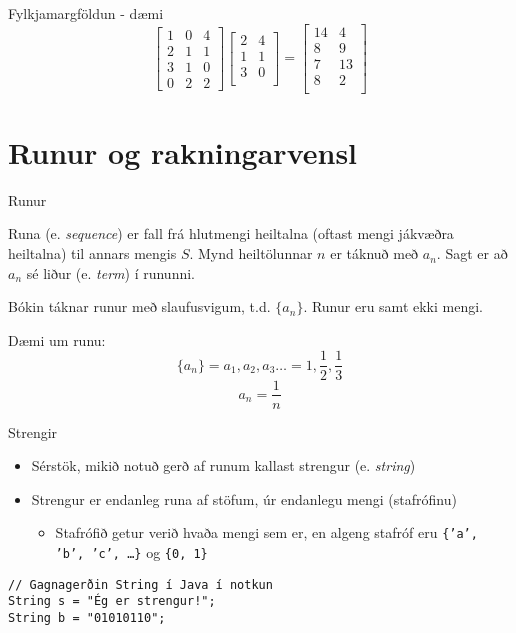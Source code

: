 \documentclass[handout]{beamer}
\begin{document}
\begin{frame}{Fylkjamargföldun - dæmi}
\[
\begin{bmatrix}
1&0&4\\2&1&1\\3&1&0\\0&2&2
\end{bmatrix}
\begin{bmatrix}
2&4\\
1&1\\
3&0\\
\end{bmatrix}
=
\begin{bmatrix}
14&4\\
8&9\\
7&13\\
8&2\\
\end{bmatrix}
\]

\end{frame}


\section{Runur og rakningarvensl}

\begin{frame}{Runur}
\begin{tcolorbox}[title=Runur]
Runa (e. \emph{sequence}) er fall frá hlutmengi heiltalna (oftast mengi jákvæðra heiltalna) til annars mengis $S$. Mynd heiltölunnar $n$ er táknuð með $a_n$. Sagt er að $a_n$ sé liður (e. \emph{term}) í rununni.
\end{tcolorbox}
Bókin táknar runur með slaufusvigum, t.d. $\{a_n\}$. Runur eru samt ekki mengi.

Dæmi um runu:
\[
 \{a_n\} = a_1, a_2, a_3 \ldots = 1, \frac{1}{2}, \frac{1}{3}
\]
\[
 a_n = \frac{1}{n}
\]
\end{frame}

\begin{frame}[fragile]{Strengir}
\begin{itemize}
 \item Sérstök, mikið notuð gerð af runum kallast strengur (e. \emph{string})
 \item Strengur er endanleg runa af stöfum, úr endanlegu mengi (stafrófinu)
 \begin{itemize}
  \item Stafrófið getur verið hvaða mengi sem er, en algeng stafróf eru \texttt{\{'a', 'b', 'c', \ldots\}} og \texttt{\{0, 1\}}
 \end{itemize}
\end{itemize}

\begin{verbatim}
// Gagnagerðin String í Java í notkun
String s = "Ég er strengur!";
String b = "01010110";
\end{verbatim}
\end{frame}
\end{document}
